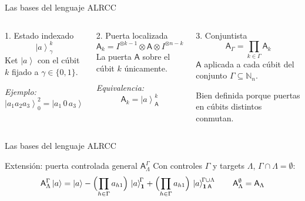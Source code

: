 \documentclass[12pt, aspectratio=169]{beamer}
\newcommand{\qg}[1]{\mathsf{#1}}
\newcommand{\stateket}[3]{\left|#1\right\rangle^{\!#2}_{#3}}
\newcommand{\stategate}[3]{\qg{#1}^{#2}_{#3}}
\newcommand{\ket}[1]{\left|#1\right\rangle}
\begin{document}
\begin{frame}{Las bases del lenguaje ALRCC}
  \begin{columns}[T]
    \begin{block}{1. Estado indexado}
      \centering
      \[
        \stateket{a}{k}{\gamma}
      \]
      \small
      Ket $\ket{a}$ con el cúbit $k$ fijado a $\gamma \in \{0,1\}$.

      \smallskip
      \textit{Ejemplo:}
      \[
        \stateket{a_1 a_2 a_3}{2}{0} = \ket{a_1\,0\,a_3}
      \]
    \end{block}

    \begin{block}{2. Puerta localizada}
      \centering
      \[
        \qg{A}_k = I^{\otimes k-1} \otimes \qg{A} \otimes I^{\otimes n-k}
      \]
      \small
      La puerta $\qg{A}$ sobre el cúbit $k$ únicamente.

      \smallskip
      \textit{Equivalencia:}
      \[
        \qg{A}_k = \stateket{a}{k}{\qg{A}}
      \]
    \end{block}

    \begin{block}{3. Conjuntista}
      \centering
      \[
        \qg{A}_\Gamma = \prod_{k \in \Gamma} \qg{A}_k
      \]
      \small
      $\qg{A}$ aplicada a cada cúbit del conjunto $\Gamma \subseteq \mathbb{N}_n$.

      \smallskip
      Bien definida porque puertas en cúbits distintos conmutan.
    \end{block}
  \end{columns}
\end{frame}

\begin{frame}{Las bases del lenguaje ALRCC}
  \begin{block}{Extensión: puerta controlada general $\stategate{A}{\Gamma}{\Lambda}$}
    \small
    Con controles $\Gamma$ y targets $\Lambda$, $\Gamma \cap \Lambda = \emptyset$:
    \[
      \stategate{A}{\Gamma}{\Lambda}\ket{a}
      = \ket{a}
      - \Bigl(\prod_{h \in \Gamma} a_{h1}\Bigr)\,\stateket{a}{\Gamma}{\mathbf{1}}
      + \Bigl(\prod_{h \in \Gamma} a_{h1}\Bigr)\,\stateket{a}{\Gamma \cup \Lambda}{\mathbf{1}\,\qg{A}}
      \quad\quad \stategate{A}{\emptyset}{\Lambda} = \qg{A}_\Lambda
    \]
  \end{block}
\end{frame}

\end{document}
